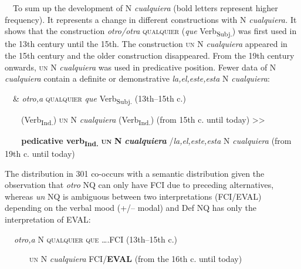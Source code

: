\begin{styleStandard}
\ \ To sum up the development of N\textit{ cualquiera} (bold letters represent higher frequency). It represents a change in different constructions with N\textit{ cualquiera. }It shows that the construction \textit{otro/otra} \textsc{qualquier} (\textit{que }Verb\textsubscript{Subj.})\textbf{ }was first used in the 13th century until the 15th. The construction \textsc{un}\textit{ }N\textit{ cualquiera} appeared in the 15th century and the older construction disappeared. From the 19th century onwards, \textsc{un}\textit{ }N \textit{cualquiera} was used in predicative position. Fewer data of N \textit{cualquiera} contain a definite or demonstrative \textit{la,el,este,esta} N \textit{cualquiera}:
\end{styleStandard}

\begin{styleStandard}
\ \ \& \textit{otro,a} \textsc{qualquier} \textit{que }Verb\textsubscript{Subj.} (13th–15th c.) 
\end{styleStandard}

\begin{styleStandard}
\ \ \ \ (Verb\textsubscript{Ind.}) \textsc{un} N \textit{cualquiera} (Verb\textsubscript{Ind.}) (from 15th c. until today) {\textgreater}{\textgreater}
\end{styleStandard}

\begin{styleStandard}
\ \ \textit{\ \ }\textbf{pedicative verb}\textbf{\textsubscript{Ind.}}\textbf{ }\textbf{\textsc{un}}\textbf{ N }\textbf{\textit{cualquiera}} /\textit{la,el,este,esta} N \textit{cualquiera} (from 19th c. until today)
\end{styleStandard}

\begin{styleStandard}
The distribution in 301 co-occurs with a semantic distribution given the observation that \textit{otro} NQ can only have FCI due to preceding alternatives, whereas \textit{un} NQ is ambiguous between two interpretations (FCI/EVAL) depending on the verbal mood (+/– modal) and Def NQ has only the interpretation of EVAL:
\end{styleStandard}

\begin{styleStandard}
\textbf{\ \ }\textit{otro,a} N \textsc{qualquier que}\textbf{ }….FCI (13th–15th c.) 
\end{styleStandard}

\begin{styleStandard}
\ \ \ \ \ \ \textsc{un} N \textit{cualquiera} FCI/\textbf{EVAL} (from the 16th c. until today) 
\end{styleStandard}


